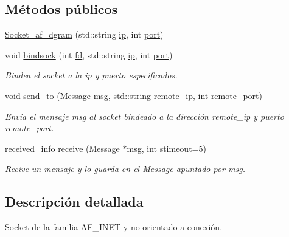 \subsection*{Métodos públicos}
\begin{DoxyCompactItemize}
\item 
\hyperlink{classSocket__af__dgram_a11391f68bb56dafa6be879f388e4b0cd}{Socket\+\_\+af\+\_\+dgram} (std\+::string \hyperlink{classSocket__base_aed490170422026c6dfe5def12031cd04}{ip}, int \hyperlink{classSocket__base_afcdd7ae81a9fb867d012b7db8c259576}{port})
\item 
void \hyperlink{classSocket__af__dgram_a6a2084d50ab117b0bf6b699aa0573db5}{bindsock} (int \hyperlink{classSocket__base_a740aedbac3269e4981732dd6842cd9c2}{fd}, std\+::string \hyperlink{classSocket__base_aed490170422026c6dfe5def12031cd04}{ip}, int \hyperlink{classSocket__base_afcdd7ae81a9fb867d012b7db8c259576}{port})
\begin{DoxyCompactList}\small\item\em Bindea el socket a la ip y puerto especificados. \end{DoxyCompactList}\item 
void \hyperlink{classSocket__af__dgram_a744bb661eeebe5b5cdfca0028da6bd88}{send\+\_\+to} (\hyperlink{structMessage}{Message} msg, std\+::string remote\+\_\+ip, int remote\+\_\+port)
\begin{DoxyCompactList}\small\item\em Envía el mensaje {\itshape msg} al socket bindeado a la dirección {\itshape remote\+\_\+ip} y puerto {\itshape remote\+\_\+port}. \end{DoxyCompactList}\item 
\hyperlink{structreceived__info}{received\+\_\+info} \hyperlink{classSocket__af__dgram_ac7d122d2317d980c48964076c3c7e2bb}{receive} (\hyperlink{structMessage}{Message} $\ast$msg, int stimeout=5)
\begin{DoxyCompactList}\small\item\em Recive un mensaje y lo guarda en el \hyperlink{structMessage}{Message} apuntado por {\itshape msg}. \end{DoxyCompactList}\end{DoxyCompactItemize}


\subsection{Descripción detallada}
Socket de la familia A\+F\+\_\+\+I\+N\+ET y no orientado a conexión. 

